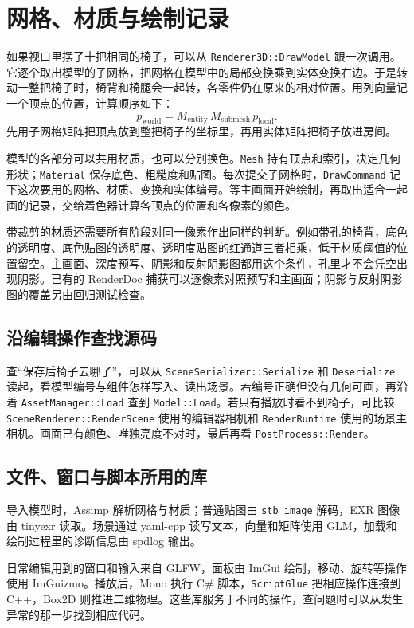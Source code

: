 \documentclass[UTF8,fontset=fandol,10pt,a4paper]{ctexart}
\newcommand{\code}[1]{{\small\texttt{#1}}}
\newcommand{\ruleline}{\par\vspace{-4pt}{\color{line}\hrule}\vspace{8pt}}
\begin{document}
\clearpage
\clearpage

\clearpage
\section{网格、材质与绘制记录}\ruleline
如果视口里摆了十把相同的椅子，可以从 \code{Renderer3D::DrawModel} 跟一次调用。它逐个取出模型的子网格，把网格在模型中的局部变换乘到实体变换右边。于是转动一整把椅子时，椅背和椅腿会一起转，各零件仍在原来的相对位置。用列向量记一个顶点的位置，计算顺序如下：
\[
 p_{\mathrm{world}}=M_{\mathrm{entity}}\,M_{\mathrm{submesh}}\,p_{\mathrm{local}} .
\]
先用子网格矩阵把顶点放到整把椅子的坐标里，再用实体矩阵把椅子放进房间。

模型的各部分可以共用材质，也可以分别换色。\code{Mesh} 持有顶点和索引，决定几何形状；\code{Material} 保存底色、粗糙度和贴图。每次提交子网格时，\code{DrawCommand} 记下这次要用的网格、材质、变换和实体编号。等主画面开始绘制，再取出适合一起画的记录，交给着色器计算各顶点的位置和各像素的颜色。

带裁剪的材质还需要所有阶段对同一像素作出同样的判断。例如带孔的椅背，底色的透明度、底色贴图的透明度、透明度贴图的红通道三者相乘，低于材质阈值的位置留空。主画面、深度预写、阴影和反射阴影图都用这个条件，孔里才不会凭空出现阴影。已有的 RenderDoc 捕获可以逐像素对照预写和主画面；阴影与反射阴影图的覆盖另由回归测试检查。

\subsection{沿编辑操作查找源码}
查“保存后椅子去哪了”，可以从 \code{SceneSerializer::Serialize} 和 \code{Deserialize} 读起，看模型编号与组件怎样写入、读出场景。若编号正确但没有几何可画，再沿着 \code{AssetManager::Load} 查到 \code{Model::Load}。若只有播放时看不到椅子，可比较 \code{SceneRenderer::RenderScene} 使用的编辑器相机和 \code{RenderRuntime} 使用的场景主相机。画面已有颜色、唯独亮度不对时，最后再看 \code{PostProcess::Render}。

\subsection{文件、窗口与脚本所用的库}
导入模型时，Assimp 解析网格与材质；普通贴图由 \code{stb\_image} 解码，EXR 图像由 tinyexr 读取。场景通过 yaml-cpp 读写文本，向量和矩阵使用 GLM，加载和绘制过程里的诊断信息由 spdlog 输出。

日常编辑用到的窗口和输入来自 GLFW，面板由 ImGui 绘制，移动、旋转等操作使用 ImGuizmo。播放后，Mono 执行 C\# 脚本，\code{ScriptGlue} 把相应操作连接到 C++，Box2D 则推进二维物理。这些库服务于不同的操作，查问题时可以从发生异常的那一步找到相应代码。
\end{document}
